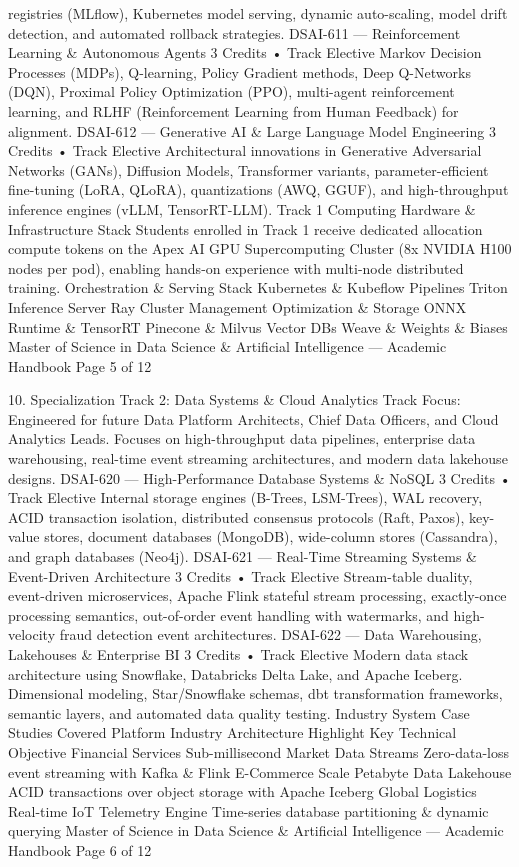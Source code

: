 \documentclass[12pt]{article}
\begin{document}
registries (MLflow), Kubernetes model serving, dynamic auto-scaling, model drift detection, and automated
rollback strategies.
DSAI-611 — Reinforcement Learning \& Autonomous Agents
3 Credits • Track Elective
Markov Decision Processes (MDPs), Q-learning, Policy Gradient methods, Deep Q-Networks (DQN), Proximal
Policy Optimization (PPO), multi-agent reinforcement learning, and RLHF (Reinforcement Learning from Human
Feedback) for alignment.
DSAI-612 — Generative AI \& Large Language Model Engineering
3 Credits • Track Elective
Architectural innovations in Generative Adversarial Networks (GANs), Diffusion Models, Transformer variants,
parameter-efficient fine-tuning (LoRA, QLoRA), quantizations (AWQ, GGUF), and high-throughput inference
engines (vLLM, TensorRT-LLM).
Track 1 Computing Hardware \& Infrastructure Stack
Students enrolled in Track 1 receive dedicated allocation compute tokens on the Apex AI GPU Supercomputing
Cluster (8x NVIDIA H100 nodes per pod), enabling hands-on experience with multi-node distributed training.
Orchestration \& Serving Stack
Kubernetes \& Kubeflow Pipelines
Triton Inference Server
Ray Cluster Management
Optimization \& Storage
ONNX Runtime \& TensorRT
Pinecone \& Milvus Vector DBs
Weave \& Weights \& Biases
Master of Science in Data Science \& Artificial Intelligence — Academic Handbook
Page 5 of 12

10. Specialization Track 2: Data Systems \& Cloud Analytics
Track Focus: Engineered for future Data Platform Architects, Chief Data Officers, and Cloud Analytics Leads.
Focuses on high-throughput data pipelines, enterprise data warehousing, real-time event streaming
architectures, and modern data lakehouse designs.
DSAI-620 — High-Performance Database Systems \& NoSQL
3 Credits • Track Elective
Internal storage engines (B-Trees, LSM-Trees), WAL recovery, ACID transaction isolation, distributed consensus
protocols (Raft, Paxos), key-value stores, document databases (MongoDB), wide-column stores (Cassandra), and
graph databases (Neo4j).
DSAI-621 — Real-Time Streaming Systems \& Event-Driven Architecture
3 Credits • Track Elective
Stream-table duality, event-driven microservices, Apache Flink stateful stream processing, exactly-once
processing semantics, out-of-order event handling with watermarks, and high-velocity fraud detection event
architectures.
DSAI-622 — Data Warehousing, Lakehouses \& Enterprise BI
3 Credits • Track Elective
Modern data stack architecture using Snowflake, Databricks Delta Lake, and Apache Iceberg. Dimensional
modeling, Star/Snowflake schemas, dbt transformation frameworks, semantic layers, and automated data
quality testing.
Industry System Case Studies Covered
Platform Industry
Architecture Highlight
Key Technical Objective
Financial Services
Sub-millisecond Market Data Streams
Zero-data-loss event streaming with Kafka \& Flink
E-Commerce Scale
Petabyte Data Lakehouse
ACID transactions over object storage with Apache Iceberg
Global Logistics
Real-time IoT Telemetry Engine
Time-series database partitioning \& dynamic querying
Master of Science in Data Science \& Artificial Intelligence — Academic Handbook
Page 6 of 12
\end{document}
